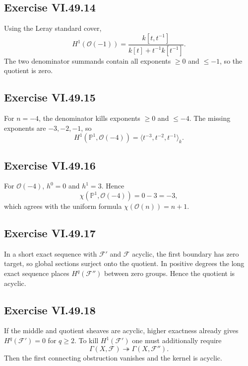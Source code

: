 \subsection*{Exercise VI.49.14}
\begin{solution}
Using the Leray standard cover,
\[
H^1(\mathcal O(-1))
=\frac{k[t,t^{-1}]}{k[t]+t^{-1}k[t^{-1}]}.
\]
The two denominator summands contain all exponents \(\ge0\) and \(\le-1\), so the quotient is zero.
\end{solution}

\subsection*{Exercise VI.49.15}
\begin{solution}
For \(n=-4\), the denominator kills exponents \(\ge0\) and \(\le-4\).  The missing exponents are \(-3,-2,-1\), so
\[
H^1(\mathbb P^1,\mathcal O(-4))
=\langle t^{-3},t^{-2},t^{-1}\rangle_k.
\]
\end{solution}

\subsection*{Exercise VI.49.16}
\begin{solution}
For \(\mathcal O(-4)\), \(h^0=0\) and \(h^1=3\).  Hence
\[
\chi(\mathbb P^1,\mathcal O(-4))=0-3=-3,
\]
which agrees with the uniform formula \(\chi(\mathcal O(n))=n+1\).
\end{solution}

\subsection*{Exercise VI.49.17}
\begin{solution}
In a short exact sequence with \(\mathcal F'\) and \(\mathcal F\) acyclic, the first boundary has zero target, so global sections surject onto the quotient.  In positive degrees the long exact sequence places \(H^q(\mathcal F'')\) between zero groups.  Hence the quotient is acyclic.
\end{solution}

\subsection*{Exercise VI.49.18}
\begin{solution}
If the middle and quotient sheaves are acyclic, higher exactness already gives \(H^q(\mathcal F')=0\) for \(q\ge2\).  To kill \(H^1(\mathcal F')\) one must additionally require
\[
\Gamma(X,\mathcal F)\twoheadrightarrow\Gamma(X,\mathcal F'').
\]
Then the first connecting obstruction vanishes and the kernel is acyclic.
\end{solution}

